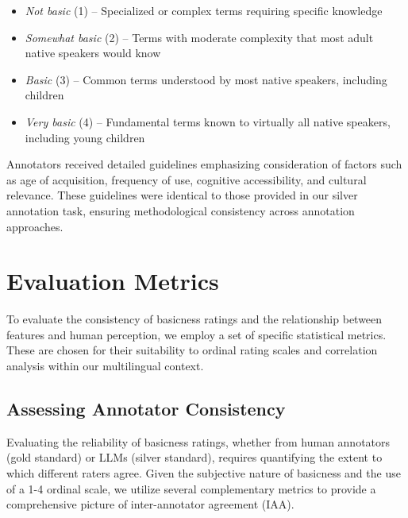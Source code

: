 \documentclass[preprint,12pt,authoryear]{elsarticle}
\begin{document}
\begin{itemize}
    \item \textit{Not basic} (1) -- Specialized or complex terms requiring specific knowledge
    \item \textit{Somewhat basic} (2) -- Terms with moderate complexity that most adult native speakers would know
    \item \textit{Basic} (3) -- Common terms understood by most native speakers, including children
    \item \textit{Very basic} (4) -- Fundamental terms known to virtually all native speakers, including young children
\end{itemize}

Annotators received detailed guidelines emphasizing consideration of factors such as age of acquisition, frequency of use, cognitive accessibility, and cultural relevance. These guidelines were identical to those provided in our silver annotation task, ensuring methodological consistency across annotation approaches.

\section{Evaluation Metrics}
\label{sec:evaluation_metrics}

To evaluate the consistency of basicness ratings and the relationship between features and human perception, we employ a set of specific statistical metrics. These are chosen for their suitability to ordinal rating scales and correlation analysis within our multilingual context.

\subsection{Assessing Annotator Consistency}

Evaluating the reliability of basicness ratings, whether from human annotators (gold standard) or LLMs (silver standard), requires quantifying the extent to which different raters agree. Given the subjective nature of basicness and the use of a 1-4 ordinal scale, we utilize several complementary metrics to provide a comprehensive picture of inter-annotator agreement (IAA).
\end{document}
